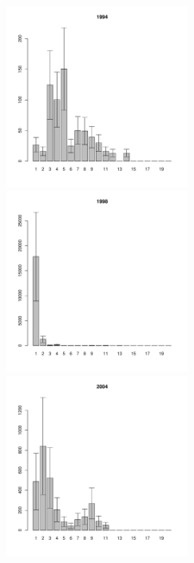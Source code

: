 \begin{figure}[h]
\begin{multicols}{3}
\hfill
\includegraphics[width=60mm]{../White_Sea/Luvenga_II_razrez/high_beatch_1994_.pdf}
\hfill
\includegraphics[width=60mm]{../White_Sea/Luvenga_II_razrez/high_beatch_1998_.pdf}
\hfill
\includegraphics[width=60mm]{../White_Sea/Luvenga_II_razrez/high_beatch_2004_.pdf}
\end{multicols}



\end{figure}
